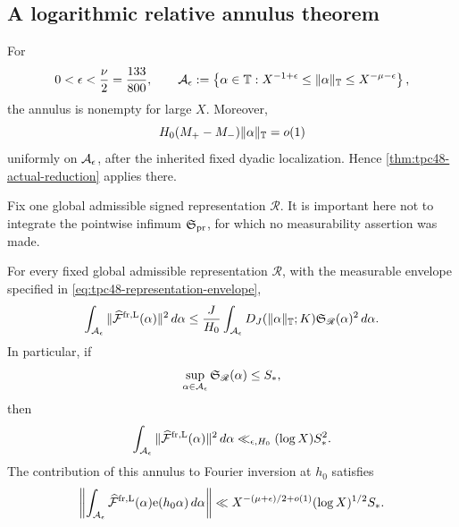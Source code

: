 \subsection{A logarithmic relative annulus theorem}

For
\begin{equation}
 0<\epsilon<\frac\nu2=\frac{133}{800},
 \qquad
 \mathcal A_\epsilon
 :=\left\{\alpha\in\mathbb T:
 X^{-1+\epsilon}\le\|\alpha\|_\mathbb T
 \le X^{-\mu-\epsilon}\right\},
 \label{eq:tpc48-annulus}
\end{equation}
the annulus is nonempty for large \(X\).  Moreover,
\begin{equation}
 H_0(M_+-M_-)\|\alpha\|_\mathbb T=o(1)
 \label{eq:tpc48-annulus-no-wrap}
\end{equation}
uniformly on \(\mathcal A_\epsilon\), after the inherited fixed dyadic
localization.  Hence \cref{thm:tpc48-actual-reduction} applies there.

Fix one global admissible signed representation \(\mathscr R\).  It
is important here not to integrate the pointwise infimum
\(\mathfrak S_{\rm pr}\), for which no measurability assertion was
made.

\begin{theorem}
\label{thm:tpc48-annular-budget}
For every fixed global admissible representation \(\mathscr R\), with
the measurable envelope specified in
\eqref{eq:tpc48-representation-envelope},
\begin{equation}
 \int_{\mathcal A_\epsilon}
 \|\widehat{\mathcal F}^{\rm fr,\mathrm L}(\alpha)\|^2\,d\alpha
 \le
 \frac J{H_0}
 \int_{\mathcal A_\epsilon}
 D_J(\|\alpha\|_\mathbb T;K)
 \mathfrak S_{\mathscr R}(\alpha)^2\,d\alpha.
 \label{eq:tpc48-weighted-annular-budget}
\end{equation}
In particular, if
\begin{equation}
 \sup_{\alpha\in\mathcal A_\epsilon}
 \mathfrak S_{\mathscr R}(\alpha)\le S_*,
 \label{eq:tpc48-annular-envelope-bound}
\end{equation}
then
\begin{equation}
 \int_{\mathcal A_\epsilon}
 \|\widehat{\mathcal F}^{\rm fr,\mathrm L}(\alpha)\|^2\,d\alpha
 \ll_{\epsilon,H_0} (\log X)S_*^2.
 \label{eq:tpc48-log-annular-budget}
\end{equation}
The contribution of this annulus to Fourier inversion at \(h_0\)
satisfies
\begin{equation}
 \left\|
 \int_{\mathcal A_\epsilon}
 \widehat{\mathcal F}^{\rm fr,\mathrm L}(\alpha)
 \mathrm e(h_0\alpha)\,d\alpha
 \right\|
 \ll
 X^{-(\mu+\epsilon)/2+o(1)}
 (\log X)^{1/2}S_*.
 \label{eq:tpc48-annular-fixed-shift-contribution}
\end{equation}
\end{theorem}

